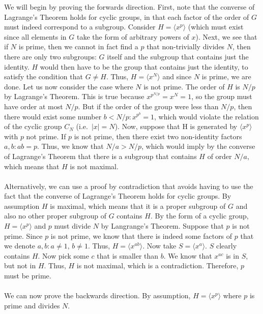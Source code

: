 \documentclass[letterpaper]{article}
\begin{document}
We will begin by proving the forwards direction.
First, note that the converse of Lagrange's Theorem holds for cyclic groups, in that each factor of the order of $ G $ must indeed correspond to a subgroup.
Consider $ H = \langle x^p \rangle $ (which must exist since all elements in $ G $ take the form of arbitrary powers of $ x $).
Next, we see that if $ N $ is prime, then we cannot in fact find a $ p $ that non-trivially divides $ N $, then there are only two subgroups: $ G $ itself and the subgroup that contains just the identity.
$ H $ would then have to be the group that contains just the identity, to satisfy the condition that $ G \neq H $.
Thus, $ H = \langle x^N \rangle $ and since $ N $ is prime, we are done.
Let us now consider the case where $ N $ is not prime.
The order of $ H $ is $ N / p $ by Lagrange's Theorem.
This is true because $ x^{p^{N / p}} = x^N = 1 $, so the group must have order at most $ N / p $.
But if the order of the group were less than $ N / p $, then there would exist some number $ b < N / p : x^{p^{b}} = 1 $, which would violate the relation of the cyclic group $ C_N $ (i.e.\ $ |x| = N $).
Now, suppose that H is generated by $ \langle x^p \rangle $ with $ p $ not prime.
If $ p $ is not prime, then there exist two non-identity factors $ a, b : ab = p $.
Thus, we know that $ N / a > N / p $, which would imply by the converse of Lagrange's Theorem that there is a subgroup that contains $ H $ of order $ N / a $, which means that $ H $ is not maximal.
\\ \\
Alternatively, we can use a proof by contradiction that avoids having to use the fact that the converse of Lagrange's Theorem holds for cyclic groups.
By assumption $ H $ is maximal, which means that it is a proper subgroup of $ G $ and also no other proper subgroup of $ G $ contains $ H $.
By the form of a cyclic group, $ H = \langle x^p \rangle $ and $ p $ must divide $ N $ by Langrange's Theorem.
Suppose that $ p $ is not prime.
Since $ p $ is not prime, we know that there is indeed some factors of $ p $ that we denote $ a, b : a \neq 1, \, b \neq 1 $.
Thus, $ H = \langle x^{ab} \rangle $.
Now take $ S = \langle x^{a} \rangle $.
$ S $ clearly contains $ H $.
Now pick some $ c $ that is smaller than $ b $.
We know that $ x^{ac} $ is in $ S $, but not in $ H $.
Thus, $ H $ is not maximal, which is a contradiction.
Therefore, $ p $ must be prime.
\\ \\
We can now prove the backwards direction.
By assumption, $ H = \langle x^p \rangle $ where $ p $ is prime and divides $ N $.
\end{document}
